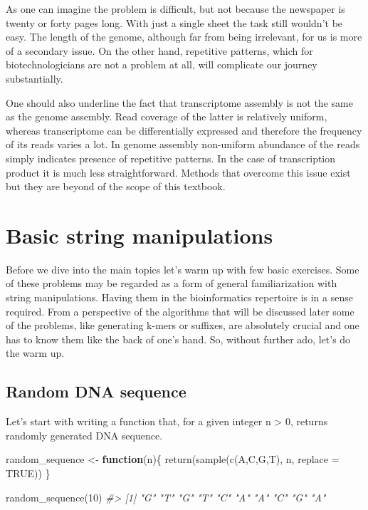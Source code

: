 \documentclass[
]{book}
\newenvironment{Shaded}{\begin{snugshade}}{\end{snugshade}}
\newcommand{\AttributeTok}[1]{\textcolor[rgb]{0.77,0.63,0.00}{#1}}
\newcommand{\CommentTok}[1]{\textcolor[rgb]{0.56,0.35,0.01}{\textit{#1}}}
\newcommand{\ConstantTok}[1]{\textcolor[rgb]{0.00,0.00,0.00}{#1}}
\newcommand{\ControlFlowTok}[1]{\textcolor[rgb]{0.13,0.29,0.53}{\textbf{#1}}}
\newcommand{\DecValTok}[1]{\textcolor[rgb]{0.00,0.00,0.81}{#1}}
\newcommand{\FunctionTok}[1]{\textcolor[rgb]{0.00,0.00,0.00}{#1}}
\newcommand{\NormalTok}[1]{#1}
\newcommand{\OtherTok}[1]{\textcolor[rgb]{0.56,0.35,0.01}{#1}}
\newcommand{\StringTok}[1]{\textcolor[rgb]{0.31,0.60,0.02}{#1}}
\begin{document}
As one can imagine the problem is difficult, but not because the newspaper is twenty or forty pages long. With just a single sheet the task still wouldn't be easy. The length of the genome, although far from being irrelevant, for us is more of a secondary issue. On the other hand, repetitive patterns, which for biotechnologicians are not a problem at all, will complicate our journey substantially.

One should also underline the fact that transcriptome assembly is not the same as the genome assembly. Read coverage of the latter is relatively uniform, whereas transcriptome can be differentially expressed and therefore the frequency of its reads varies a lot. In genome assembly non-uniform abundance of the reads simply indicates presence of repetitive patterns. In the case of transcription product it is much less straightforward. Methods that overcome this issue exist but they are beyond of the scope of this textbook.

\hypertarget{basic}{%
\chapter{Basic string manipulations}\label{basic}}

Before we dive into the main topics let's warm up with few basic exercises. Some of these problems may be regarded as a form of general familiarization with string manipulations. Having them in the bioinformatics repertoire is in a sense required. From a perspective of the algorithms that will be discussed later some of the problems, like generating k-mers or suffixes, are absolutely crucial and one has to know them like the back of one's hand. So, without further ado, let's do the warm up.

\hypertarget{random-dna-sequence}{%
\section{Random DNA sequence}\label{random-dna-sequence}}

Let's start with writing a function that, for a given integer n \textgreater{} 0, returns randomly generated DNA sequence.

\begin{Shaded}
\begin{Highlighting}[]
\NormalTok{random\_sequence }\OtherTok{\textless{}{-}} \ControlFlowTok{function}\NormalTok{(n)\{}
  \FunctionTok{return}\NormalTok{(}\FunctionTok{sample}\NormalTok{(}\FunctionTok{c}\NormalTok{(}\StringTok{\textquotesingle{}A\textquotesingle{}}\NormalTok{,}\StringTok{\textquotesingle{}C\textquotesingle{}}\NormalTok{,}\StringTok{\textquotesingle{}G\textquotesingle{}}\NormalTok{,}\StringTok{\textquotesingle{}T\textquotesingle{}}\NormalTok{), n, }\AttributeTok{replace =} \ConstantTok{TRUE}\NormalTok{))}
\NormalTok{\}}

\FunctionTok{random\_sequence}\NormalTok{(}\DecValTok{10}\NormalTok{)}
\CommentTok{\#\textgreater{}  [1] "G" "T" "G" "T" "C" "A" "A" "C" "G" "A"}
\end{Highlighting}
\end{Shaded}
\end{document}
